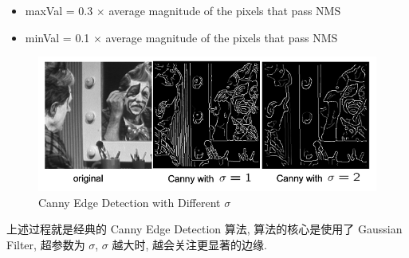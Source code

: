 \begin{itemize}
    \item maxVal = 0.3 $\times$ average magnitude of the pixels that pass NMS
    \item minVal = 0.1 $\times$ average magnitude of the pixels that pass NMS
\end{itemize}
\begin{figure}[htbp]
    \centering
    \includegraphics[scale=0.4]{figures/canny.png}
    \caption{Canny Edge Detection with Different $\sigma$}
\end{figure}
上述过程就是经典的 Canny Edge Detection 算法, 算法的核心是使用了 Gaussian Filter, 超参数为 $\sigma$, $\sigma$ 越大时, 越会关注更显著的边缘.
